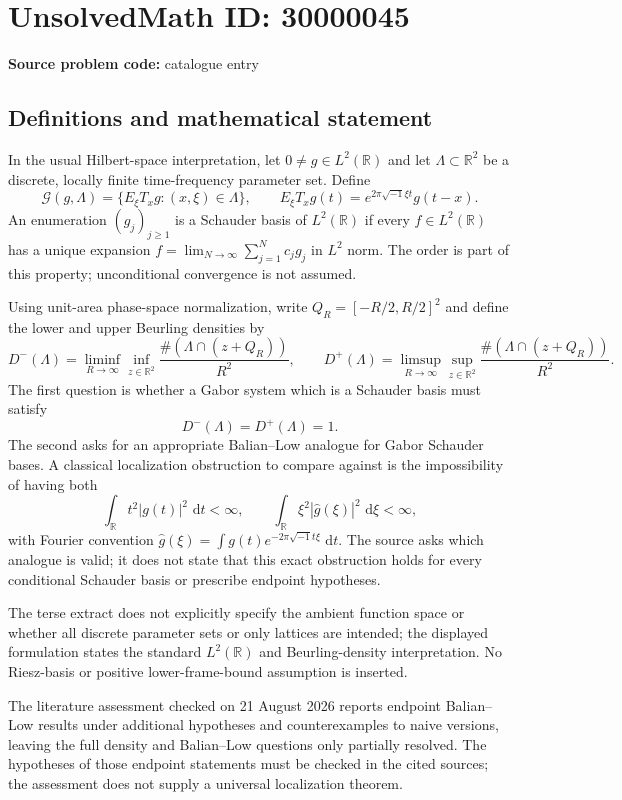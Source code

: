 \documentclass[11pt]{article}
\newcommand{\R}{\mathbb{R}}
\newcommand{\dd}{\,\mathrm{d}}
\begin{document}
\section*{UnsolvedMath ID: 30000045}
\textbf{Source problem code:} catalogue entry
\subsection{Definitions and mathematical statement}
In the usual Hilbert-space interpretation, let $0\ne g\in L^2(\R)$ and let $\Lambda\subset\R^2$ be a discrete, locally finite time-frequency parameter set. Define
\[
 \mathcal G(g,\Lambda)=\{E_\xi T_xg:(x,\xi)\in\Lambda\},\qquad
 E_\xi T_xg(t)=e^{2\pi\sqrt{-1}\xi t}g(t-x).
\]
An enumeration $(g_j)_{j\ge1}$ is a Schauder basis of $L^2(\R)$ if every $f\in L^2(\R)$ has a unique expansion $f=\lim_{N\to\infty}\sum_{j=1}^N c_jg_j$ in $L^2$ norm. The order is part of this property; unconditional convergence is not assumed.

Using unit-area phase-space normalization, write $Q_R=[-R/2,R/2]^2$ and define the lower and upper Beurling densities by
\[
 D^-(\Lambda)=\liminf_{R\to\infty}\inf_{z\in\R^2}
                  \frac{\#(\Lambda\cap(z+Q_R))}{R^2},\qquad
 D^+(\Lambda)=\limsup_{R\to\infty}\sup_{z\in\R^2}
                  \frac{\#(\Lambda\cap(z+Q_R))}{R^2}.
\]
The first question is whether a Gabor system which is a Schauder basis must satisfy
\[
 D^-(\Lambda)=D^+(\Lambda)=1.
\]
The second asks for an appropriate Balian--Low analogue for Gabor Schauder bases. A classical localization obstruction to compare against is the impossibility of having both
\[
 \int_\R t^2|g(t)|^2\,\dd t<\infty,\qquad
 \int_\R\xi^2|\widehat g(\xi)|^2\,\dd\xi<\infty,
\]
with Fourier convention $\widehat g(\xi)=\int g(t)e^{-2\pi\sqrt{-1}t\xi}\,\dd t$. The source asks which analogue is valid; it does not state that this exact obstruction holds for every conditional Schauder basis or prescribe endpoint hypotheses.

The terse extract does not explicitly specify the ambient function space or whether all discrete parameter sets or only lattices are intended; the displayed formulation states the standard $L^2(\R)$ and Beurling-density interpretation. No Riesz-basis or positive lower-frame-bound assumption is inserted.

The literature assessment checked on 21 August 2026 reports endpoint Balian--Low results under additional hypotheses and counterexamples to naive versions, leaving the full density and Balian--Low questions only partially resolved. The hypotheses of those endpoint statements must be checked in the cited sources; the assessment does not supply a universal localization theorem.
\end{document}
